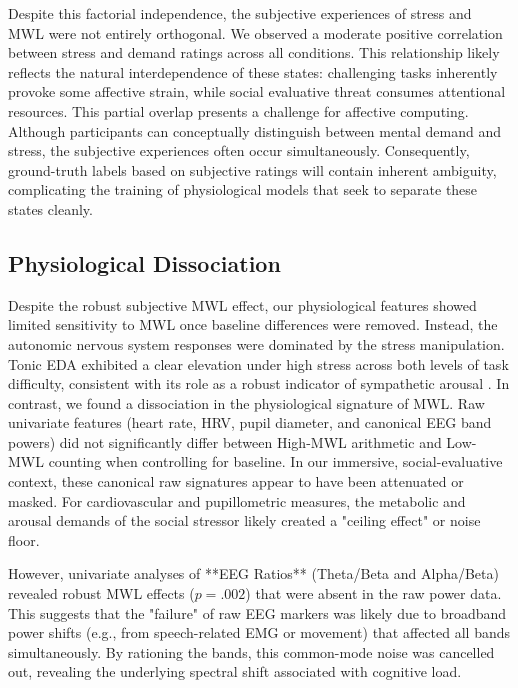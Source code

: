 \documentclass[lettersize,journal]{IEEEtran}
\begin{document}
Despite this factorial independence, the subjective experiences of stress and MWL were not entirely orthogonal. We observed a moderate positive correlation between stress and demand ratings across all conditions. This relationship likely reflects the natural interdependence of these states: challenging tasks inherently provoke some affective strain, while social evaluative threat consumes attentional resources. This partial overlap presents a challenge for affective computing. Although participants can conceptually distinguish between mental demand and stress, the subjective experiences often occur simultaneously. Consequently, ground-truth labels based on subjective ratings will contain inherent ambiguity, complicating the training of physiological models that seek to separate these states cleanly.

\subsection{Physiological Dissociation}

Despite the robust subjective MWL effect, our physiological features showed limited sensitivity to MWL once baseline differences were removed. Instead, the autonomic nervous system responses were dominated by the stress manipulation. Tonic EDA exhibited a clear elevation under high stress across both levels of task difficulty, consistent with its role as a robust indicator of sympathetic arousal \cite{faircloughFundamentalsPhysiologicalComputing2009, masiStressWorkloadAssessment2023}. In contrast, we found a dissociation in the physiological signature of MWL. Raw univariate features (heart rate, HRV, pupil diameter, and canonical EEG band powers) did not significantly differ between High-MWL arithmetic and Low-MWL counting when controlling for baseline. In our immersive, social-evaluative context, these canonical raw signatures appear to have been attenuated or masked. For cardiovascular and pupillometric measures, the metabolic and arousal demands of the social stressor likely created a "ceiling effect" or noise floor. 

However, univariate analyses of **EEG Ratios** (Theta/Beta and Alpha/Beta) revealed robust MWL effects ($p=.002$) that were absent in the raw power data. This suggests that the "failure" of raw EEG markers was likely due to broadband power shifts (e.g., from speech-related EMG or movement) that affected all bands simultaneously. By rationing the bands, this common-mode noise was cancelled out, revealing the underlying spectral shift associated with cognitive load.
\end{document}
